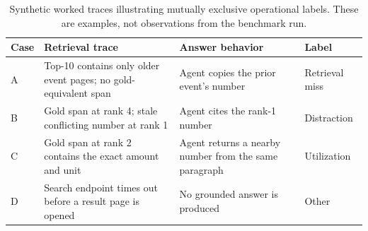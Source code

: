 \documentclass{article}
\begin{document}
\begin{table}[h]
\centering
\small
\setlength{\tabcolsep}{3.5pt}
\begin{tabular}{lp{.29\linewidth}p{.29\linewidth}p{.20\linewidth}}
\toprule
Case & Retrieval trace & Answer behavior & Label\\
\midrule
A & Top-10 contains only older event pages; no gold-equivalent span & Agent
copies the prior event's number & Retrieval miss\\
B & Gold span at rank 4; stale conflicting number at rank 1 & Agent cites the
rank-1 number & Distraction\\
C & Gold span at rank 2 contains the exact amount and unit & Agent returns a
nearby number from the same paragraph & Utilization\\
D & Search endpoint times out before a result page is opened & No grounded
answer is produced & Other\\
\bottomrule
\end{tabular}
\caption{Synthetic worked traces illustrating mutually exclusive operational
labels. These are examples, not observations from the benchmark run.}
\label{tab:trace-examples}
\end{table}
\end{document}
